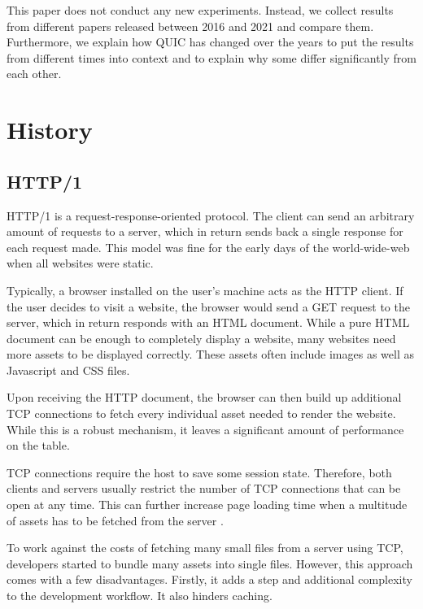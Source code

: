 \documentclass[conference]{IEEEtran}
\begin{document}
This paper does not conduct any new experiments. Instead, we collect results from different papers released between 2016 and 2021 and compare them. Furthermore, we explain how QUIC has changed over the years to put the results from different times into context and to explain why some differ significantly from each other.

\section{History}

\subsection{HTTP/1}

HTTP/1 is a request-response-oriented protocol. The client can send an arbitrary amount of requests to a server, which in return sends back a single response for each request made. This model was fine for the early days of the world-wide-web when all websites were static. 

Typically, a browser installed on the user's machine acts as the HTTP client. If the user decides to visit a website, the browser would send a GET request to the server, which in return responds with an HTML document. While a pure HTML document can be enough to completely display a website, many websites need more assets to be displayed correctly. These assets often include images as well as Javascript and CSS files.

Upon receiving the HTTP document, the browser can then build up additional TCP connections to fetch every individual asset needed to render the website. While this is a robust mechanism, it leaves a significant amount of performance on the table.

TCP connections require the host to save some session state. Therefore, both clients and servers usually restrict the number of TCP connections that can be open at any time. This can further increase page loading time when a multitude of assets has to be fetched from the server \cite{HowQuickIsQuic}. 


To work against the costs of fetching many small files from a server using TCP, developers started to bundle many assets into single files. However, this approach comes with a few disadvantages. Firstly, it adds a step and additional complexity to the development workflow. It also hinders caching.
\end{document}
